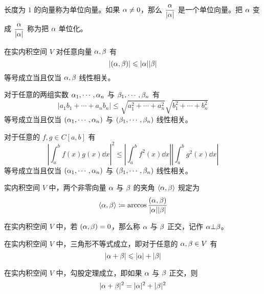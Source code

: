 长度为 $1$ 的向量称为单位向量。如果 $\alpha \ne 0$，那么 $\mfrac{\valpha}{|\valpha|}$ 是一个单位向量。把 $\alpha$ 变成 $\mfrac{\valpha}{|\valpha|}$ 称为把 $\alpha$ 单位化。

\begin{theorem}
    在实内积空间 $V$ 对任意向量 $\alpha,\beta$ 有
    \[ |(\alpha,\beta)| \leqslant |\alpha| |\beta| \]
    等号成立当且仅当 $\alpha,\beta$ 线性相关。
\end{theorem}

\begin{proposition}
    对于任意的两组实数 $\alpha_1,\cdots,\alpha_n$ 与  $\beta_1,\cdots,\beta_n$ 有
    \[ |a_1b_1 + \cdots + a_nb_n| \leqslant \sqrt{a_1^2 + \cdots + a_n^2}\sqrt{b_1^2 + \cdots + b_n^2} \]
    等号成立当且仅当 $(\alpha_1,\cdots,\alpha_n)$ 与 $(\beta_1,\cdots,\beta_n)$ 线性相关。
\end{proposition}

\begin{proposition}
    对于任意的 $f,g \in C[a,b]$ 有
    \[ \left| \int_a^b f(x)g(x) \dd x \right|^2 \leqslant \left| \int_a^b f^2(x) \dd x \right| \left| \int_a^b g^2(x) \dd x \right| \]
    等号成立当且仅当 $(\alpha_1,\cdots,\alpha_n)$ 与 $(\beta_1,\cdots,\beta_n)$ 线性相关。
\end{proposition}

\begin{definition}
    实内积空间 $V$ 中，两个非零向量 $\alpha$ 与 $\beta$ 的夹角 $\langle\alpha,\beta\rangle$ 规定为
    \[ \langle\alpha,\beta\rangle \coloneqq \arccos \frac{(\alpha,\beta)}{|\alpha||\beta|} \]
\end{definition}

\begin{definition}
    在实内积空间 $V$ 中，若 $(\alpha,\beta) = 0$，那么称 $\alpha$ 与 $\beta$ 正交，记作 $\alpha \bot \beta$。
\end{definition}

\begin{proposition}
    在实内积空间 $V$ 中，三角形不等式成立，即对于任意的 $\alpha,\beta \in V$ 有
    \[ |\alpha+\beta| \leqslant |\alpha| + |\beta| \]
\end{proposition}

\begin{proposition}
    在实内积空间 $V$ 中，勾股定理成立，即如果 $\alpha$ 与 $\beta$ 正交，则
    \[ |\alpha + \beta|^2 = |\alpha|^2 + |\beta|^2 \]
\end{proposition}

